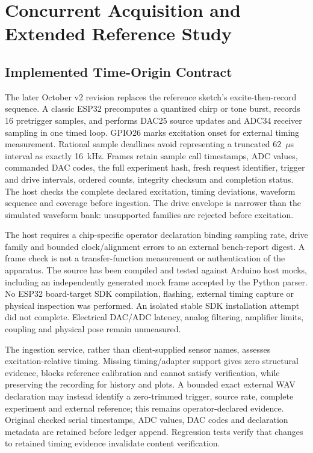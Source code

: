 \section{Concurrent Acquisition and Extended Reference Study}
\subsection{Implemented Time-Origin Contract}
The later October v2 revision replaces the reference sketch's excite-then-record sequence. A classic ESP32 precomputes a quantized chirp or tone burst, records 16 pretrigger samples, and performs DAC25 source updates and ADC34 receiver sampling in one timed loop. GPIO26 marks excitation onset for external timing measurement. Rational sample deadlines avoid representing a truncated 62~$\mu$s interval as exactly 16~kHz. Frames retain sample call timestamps, ADC values, commanded DAC codes, the full experiment hash, fresh request identifier, trigger and drive intervals, ordered counts, integrity checksum and completion status. The host checks the complete declared excitation, timing deviations, waveform sequence and coverage before ingestion. The drive envelope is narrower than the simulated waveform bank: unsupported families are rejected before excitation.

The host requires a chip-specific operator declaration binding sampling rate, drive family and bounded clock/alignment errors to an external bench-report digest. A frame check is not a transfer-function measurement or authentication of the apparatus. The source has been compiled and tested against Arduino host mocks, including an independently generated mock frame accepted by the Python parser. No ESP32 board-target SDK compilation, flashing, external timing capture or physical inspection was performed. An isolated stable SDK installation attempt did not complete. Electrical DAC/ADC latency, analog filtering, amplifier limits, coupling and physical pose remain unmeasured.

The ingestion service, rather than client-supplied sensor names, assesses excitation-relative timing. Missing timing/adapter support gives zero structural evidence, blocks reference calibration and cannot satisfy verification, while preserving the recording for history and plots. A bounded exact external WAV declaration may instead identify a zero-trimmed trigger, source rate, complete experiment and external reference; this remains operator-declared evidence. Original checked serial timestamps, ADC values, DAC codes and declaration metadata are retained before ledger append. Regression tests verify that changes to retained timing evidence invalidate content verification.

